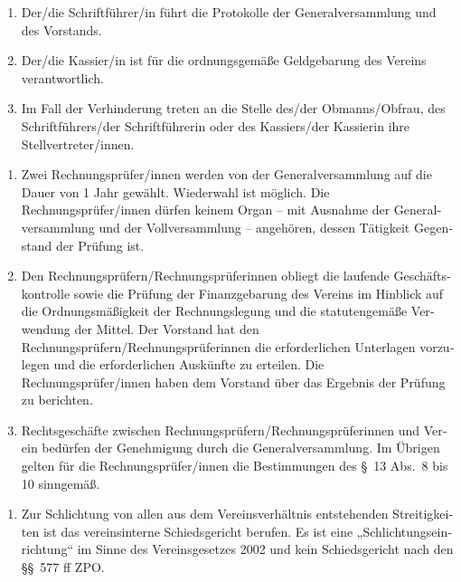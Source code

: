 \begin{otherlanguage}{german}
\begin{enumerate}[statutenenum]
    \item Der/die Schriftführer/in führt die Protokolle der Generalversammlung und des Vorstands.

    \item Der/die Kassier/in ist für die ordnungsgemäße Geldgebarung des Vereins verantwortlich.

    \item Im Fall der Verhinderung treten an die Stelle des/der Obmanns/Obfrau, des Schriftführers/der Schriftführerin oder des Kassiers/der Kassierin ihre Stellvertreter/innen.
\end{enumerate}


\begin{enumerate}[statutenenum]
    \item Zwei Rechnungsprüfer/innen werden von der Generalversammlung auf die Dauer von 1 Jahr gewählt.
        Wiederwahl ist möglich.
        Die Rechnungsprüfer/innen dürfen keinem Organ -- mit Ausnahme der Generalversammlung und der Vollversammlung -- angehören, dessen Tätigkeit Gegenstand der Prüfung ist.

    \item Den Rechnungsprüfern/Rechnungsprüferinnen obliegt die laufende Geschäftskontrolle sowie die Prüfung der Finanzgebarung des Vereins im Hinblick auf die Ordnungsmäßigkeit der Rechnungslegung und die statutengemäße Verwendung der Mittel.
        Der Vorstand hat den Rechnungsprüfern/Rechnungsprüferinnen die erforderlichen Unterlagen vorzulegen und die erforderlichen Auskünfte zu erteilen.
        Die Rechnungsprüfer/innen haben dem Vorstand über das Ergebnis der Prüfung zu berichten.

    \item Rechtsgeschäfte zwischen Rechnungsprüfern/Rechnungsprüferinnen und Verein bedürfen der Genehmigung durch die Generalversammlung.
        Im Übrigen gelten für die Rechnungsprüfer/innen die Bestimmungen des \S\ 13 Abs.\ 8 bis 10 sinngemäß.
\end{enumerate}


\begin{enumerate}[statutenenum]
    \item Zur Schlichtung von allen aus dem Vereinsverhältnis entstehenden Streitigkeiten ist das vereinsinterne Schiedsgericht berufen.
        Es ist eine „Schlichtungseinrichtung“ im Sinne des Vereinsgesetzes 2002 und kein Schiedsgericht nach den \S\S\ 577 ff ZPO.


\end{enumerate}
\end{otherlanguage}
